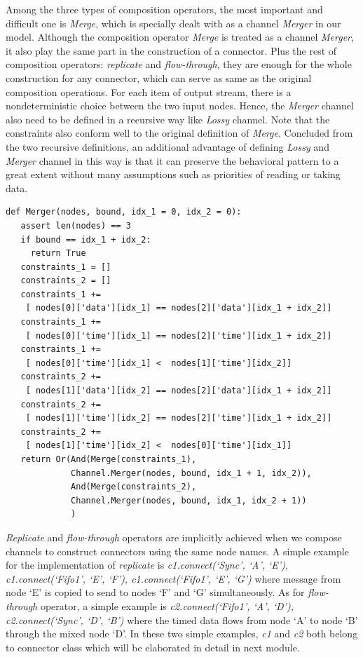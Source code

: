 \documentclass[3p,times]{elsarticle}
\begin{document}
Among the three types of composition operators, the most important and difficult one is \emph{Merge}, which is specially dealt with as a channel \emph{Merger} in our model. Although the composition operator \emph{Merge} is treated as a channel \emph{Merger}, it also play the same part in the construction of a connector.  Plus the rest of composition operators: \emph{replicate} and \emph{flow-through}, they are enough for the whole construction for any connector, which can serve as same as the original composition operations. For each item of output stream, there is a nondeterministic choice between the two input nodes. Hence, the \emph{Merger} channel also need to be defined in a recursive way like \emph{Lossy} channel. Note that the constraints also conform well to the original definition of \emph{Merge}. Concluded from the two recursive definitions, an additional advantage of defining \emph{Lossy} and \emph{Merger} channel in this way is that it can preserve the behavioral pattern to a great extent without many assumptions such as priorities of reading or taking data.
\begin{lstlisting}[frame=single]
def Merger(nodes, bound, idx_1 = 0, idx_2 = 0):
   assert len(nodes) == 3
   if bound == idx_1 + idx_2:
     return True
   constraints_1 = []
   constraints_2 = []
   constraints_1 +=
    [ nodes[0]['data'][idx_1] == nodes[2]['data'][idx_1 + idx_2]]
   constraints_1 +=
    [ nodes[0]['time'][idx_1] == nodes[2]['time'][idx_1 + idx_2]]
   constraints_1 +=
    [ nodes[0]['time'][idx_1] <  nodes[1]['time'][idx_2]]
   constraints_2 +=
    [ nodes[1]['data'][idx_2] == nodes[2]['data'][idx_1 + idx_2]]
   constraints_2 +=
    [ nodes[1]['time'][idx_2] == nodes[2]['time'][idx_1 + idx_2]]
   constraints_2 +=
    [ nodes[1]['time'][idx_2] <  nodes[0]['time'][idx_1]]
   return Or(And(Merge(constraints_1),
             Channel.Merger(nodes, bound, idx_1 + 1, idx_2)),
             And(Merge(constraints_2),
             Channel.Merger(nodes, bound, idx_1, idx_2 + 1))
             )
\end{lstlisting}
\emph{Replicate} and \emph{flow-through} operators are implicitly achieved when we compose channels to construct connectors using the same node names. A simple example for the implementation of \emph{replicate} is \emph{c1.connect(`Sync', `A', `E'), c1.connect(`Fifo1', `E', `F'), c1.connect(`Fifo1', `E', `G')} where message from node `E' is copied to send to nodes `F' and `G' simultaneously. As for \emph{flow-through} operator, a simple example is \emph{c2.connect(`Fifo1', `A', `D'), c2.connect(`Sync', `D', `B')} where the timed data flows from node `A' to node `B' through the mixed node `D'. In these two simple examples, \emph{c1} and \emph{c2} both belong to connector class which will be elaborated in detail in next module.
\end{document}
